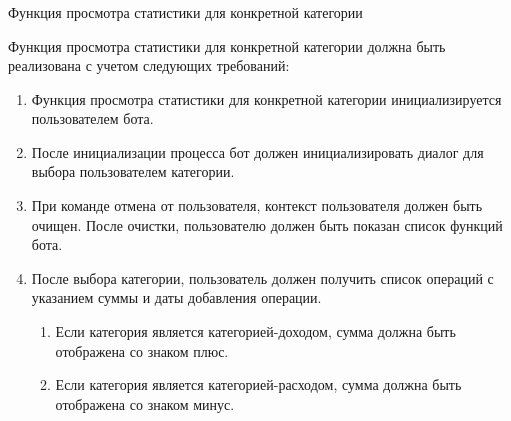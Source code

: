\subsubsection{} Функция просмотра статистики для конкретной категории
\label{sec:domain:specification:showcustomcategorystats}

Функция просмотра статистики для конкретной категории должна быть реализована с учетом следующих требований:

\begin{enumerate}
	\item Функция просмотра статистики для конкретной категории инициализируется пользователем бота.
	\item После инициализации процесса бот должен инициализировать диалог для выбора пользователем категории.
	\item При команде отмена от пользователя, контекст пользователя должен быть очищен. После очистки, пользователю должен быть показан список функций бота.
	\item После выбора категории, пользователь должен получить список операций с указанием суммы и даты добавления операции.
	\begin{enumerate}
		\item Если категория является категорией-доходом, сумма должна быть отображена со знаком плюс.
		\item Если категория является категорией-расходом, сумма должна быть отображена со знаком минус.
	\end{enumerate}
\end{enumerate}